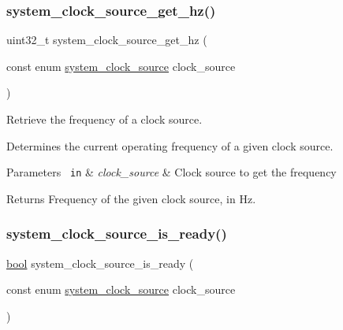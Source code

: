 \mbox{\label{group__asfdoc__sam0__system__clock__group_ga1894d901b7ed10e4c1e52a784c8962be}} 
\subsubsection{\texorpdfstring{system\_clock\_source\_get\_hz()}{system\_clock\_source\_get\_hz()}}
{\footnotesize\ttfamily uint32\+\_\+t system\+\_\+clock\+\_\+source\+\_\+get\+\_\+hz (\begin{DoxyParamCaption}\item[{const enum \mbox{\hyperlink{group__asfdoc__sam0__system__clock__group_ga86882dc960f2552722e9713da97fcc58}{system\+\_\+clock\+\_\+source}}}]{clock\+\_\+source }\end{DoxyParamCaption})}



Retrieve the frequency of a clock source. 

Determines the current operating frequency of a given clock source.


\begin{DoxyParams}[1]{Parameters}
\mbox{\texttt{ in}}  & {\em clock\+\_\+source} & Clock source to get the frequency\\
\hline
\end{DoxyParams}
\begin{DoxyReturn}{Returns}
Frequency of the given clock source, in Hz. 
\end{DoxyReturn}
\mbox{\label{group__asfdoc__sam0__system__clock__group_ga2f18617c9770bf1c3ab8fdac5081e65e}} 
\subsubsection{\texorpdfstring{system\_clock\_source\_is\_ready()}{system\_clock\_source\_is\_ready()}}
{\footnotesize\ttfamily \mbox{\hyperlink{group__group__sam0__utils_ga97a80ca1602ebf2303258971a2c938e2}{bool}} system\+\_\+clock\+\_\+source\+\_\+is\+\_\+ready (\begin{DoxyParamCaption}\item[{const enum \mbox{\hyperlink{group__asfdoc__sam0__system__clock__group_ga86882dc960f2552722e9713da97fcc58}{system\+\_\+clock\+\_\+source}}}]{clock\+\_\+source }\end{DoxyParamCaption})}



